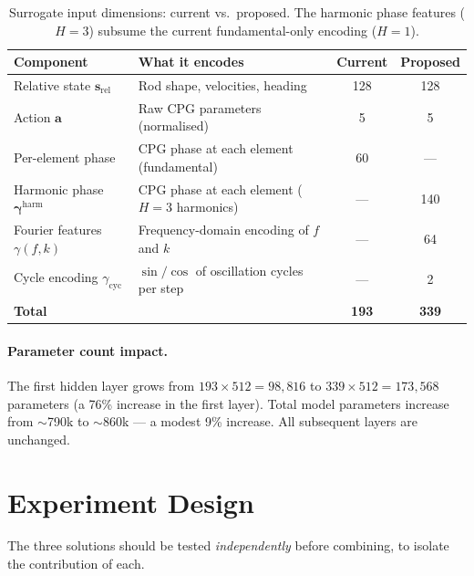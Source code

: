 \documentclass[11pt]{article}
\newcommand{\vect}[1]{\mathbf{#1}}
\begin{document}
\begin{table}[H]
  \centering
  \renewcommand{\arraystretch}{1.3}
  \begin{tabular}{llcc}
    \toprule
    \textbf{Component} & \textbf{What it encodes} & \textbf{Current} & \textbf{Proposed} \\
    \midrule
    Relative state $\vect{s}_{\mathrm{rel}}$
      & Rod shape, velocities, heading & 128 & 128 \\
    Action $\vect{a}$
      & Raw CPG parameters (normalised) & 5 & 5 \\
    Per-element phase
      & CPG phase at each element (fundamental) & 60 & --- \\
    Harmonic phase $\vect{\gamma}^{\mathrm{harm}}$
      & CPG phase at each element ($H = 3$ harmonics) & --- & 140 \\
    Fourier features $\gamma(f, k)$
      & Frequency-domain encoding of $f$ and $k$ & --- & 64 \\
    Cycle encoding $\gamma_{\mathrm{cyc}}$
      & $\sin/\cos$ of oscillation cycles per step & --- & 2 \\
    \midrule
    \textbf{Total} & & \textbf{193} & \textbf{339} \\
    \bottomrule
  \end{tabular}
  \caption{Surrogate input dimensions: current vs.\ proposed.
    The harmonic phase features ($H = 3$) subsume the current fundamental-only
    encoding ($H = 1$).}
  \label{tab:input-dims}
\end{table}

\paragraph{Parameter count impact.}
The first hidden layer grows from $193 \times 512 = 98{,}816$ to
$339 \times 512 = 173{,}568$ parameters (a 76\% increase in the first layer).
Total model parameters increase from $\sim$790k to $\sim$860k ---
a modest 9\% increase.
All subsequent layers are unchanged.

\section{Experiment Design}
\label{sec:experiments}

The three solutions should be tested \emph{independently} before combining,
to isolate the contribution of each.
\end{document}
